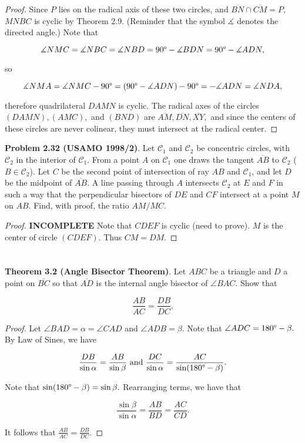 \documentclass[letterpaper,oneside]{book}
\begin{document}
  \begin{proof}  Since $P$ lies on the radical axis of these two circles, and $\overline{BN} \cap \overline{CM} =P,$ $MNBC$ is cyclic by Theorem 2.9. (Reminder that the symbol $\measuredangle$ denotes the directed angle.) Note that

$$\measuredangle NMC = \measuredangle NBC = \measuredangle NBD = 90\degree - \measuredangle BDN =  90\degree - \measuredangle ADN,$$

so 

$$\measuredangle NMA =   \measuredangle NMC -90\degree = (90\degree - \measuredangle ADN) - 90\degree = -\measuredangle ADN = \measuredangle NDA,$$

therefore quadrilateral $DAMN$ is cyclic. The radical axes of the circles $(DAMN), (AMC),$ and $(BND)$ are $\overline{AM}, \overline{DN}, \overline{XY},$ and since the centers of these circles are never colinear, they must intersect at the radical center. \end{proof}

  

  \textbf{Problem 2.32 (USAMO 1998/2)}.   Let $\mathcal{C}_1$ and $\mathcal{C}_2$ be concentric circles, with $\mathcal{C}_2$ in the interior of $\mathcal{C}_1$. From a point $A$ on $\mathcal{C}_1$ one draws the tangent $\overline{AB}$ to $\mathcal{C}_2$  ($B \in  \mathcal{C}_2$). Let $C$ be the second point of intersection of ray $AB$ and $\mathcal{C}_1$, and let $D$ be the midpoint of $\overline{AB}$. A line passing through $A$ intersects $\mathcal{C}_2$ at $E$ and $F$ in such a way that the perpendicular bisectors of $DE$ and $CF$ intersect at a point $M$ on $AB$. Find, with proof, the ratio $AM/MC$.
 
  \begin{proof}  \textbf{INCOMPLETE}
    Note that $CDEF$ is cyclic (need to prove). $M$ is the center of circle $(CDEF).$ Thus $CM=DM.$ \end{proof}

\chapter{}
  \textbf{Theorem 3.2 (Angle Bisector Theorem)}.   Let $ABC$ be a triangle and $D$ a point on $\overline{BC}$ so that $\overline{AD}$ is the internal angle bisector of $\angle BAC.$ Show that

$$\frac{AB}{AC} = \frac{DB}{DC}.$$

 \begin{proof}  Let $\angle BAD = \alpha = \angle CAD$ and $\angle ADB = \beta.$ Note that $\angle ADC = 180\degree - \beta.$ By Law of Sines, we have

$$\frac{DB}{\sin\alpha} = \frac{AB}{\sin\beta} \text{  and  } \frac{DC}{\sin\alpha} = \frac{AC}{\sin(180\degree - \beta)}.$$

Note that $\sin(180\degree-\beta) = \sin\beta.$ Rearranging terms, we have that

$$\frac{\sin\beta}{\sin\alpha} = \frac{AB}{BD} = \frac{AC}{CD}.$$

It follows that $\frac{AB}{AC} = \frac{DB}{DC}.$
 \end{proof}
\end{document}
